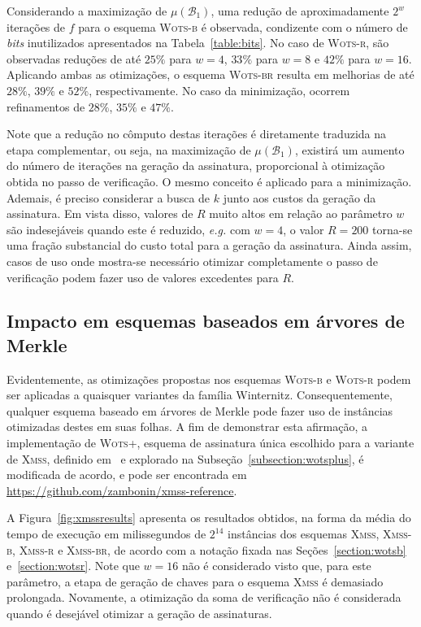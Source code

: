 \documentclass{ufsctex/ufsctex}
\newcommand{\bone}{\mathcal{B}_{1}}
\newcommand{\wotsplus}{\textsc{Wots+}}
\newcommand{\wotsb}{\textsc{Wots-b}}
\newcommand{\wotsr}{\textsc{Wots-r}}
\newcommand{\wotsbr}{\textsc{Wots-br}}
\newcommand{\xmss}{\textsc{Xmss}}
\newcommand{\xmssb}{\textsc{Xmss-b}}
\newcommand{\xmssr}{\textsc{Xmss-r}}
\newcommand{\xmssbr}{\textsc{Xmss-br}}
\begin{document}
Considerando a maximização de $\mu(\bone{})$, uma redução de aproximadamente
$2^{w}$ iterações de $f$ para o esquema \wotsb{} é observada, condizente com o
número de \emph{bits} inutilizados apresentados na Tabela~\ref{table:bits}. No
caso de \wotsr{}, são observadas reduções de até $25\%$ para $w = 4$, $33\%$
para $w = 8$ e $42\%$ para $w = 16$. Aplicando ambas as otimizações, o esquema
\wotsbr{} resulta em melhorias de até $28\%$, $39\%$ e $52\%$, respectivamente.
No caso da minimização, ocorrem refinamentos de $28\%$, $35\%$ e $47\%$.

Note que a redução no cômputo destas iterações é diretamente traduzida na etapa
complementar, ou seja, na maximização de $\mu(\bone{})$, existirá um aumento do
número de iterações na geração da assinatura, proporcional à otimização obtida
no passo de verificação. O mesmo conceito é aplicado para a minimização.
Ademais, é preciso considerar a busca de $k$ junto aos custos da
geração da assinatura. Em vista disso, valores de $R$ muito altos em relação ao
parâmetro $w$ são indesejáveis quando este é reduzido, \emph{e.g.} com $w = 4$,
o valor $R = 200$ torna-se uma fração substancial do custo total para a geração
da assinatura. Ainda assim, casos de uso onde mostra-se necessário otimizar
completamente o passo de verificação podem fazer uso de valores excedentes para
$R$.

\subsection{Impacto em esquemas baseados
  em árvores de Merkle}\label{subsection:impact}

Evidentemente, as otimizações propostas nos esquemas \wotsb{} e \wotsr{} podem
ser aplicadas a quaisquer variantes da família Winternitz. Consequentemente,
qualquer esquema baseado em árvores de Merkle pode fazer uso de instâncias
otimizadas destes em suas folhas. A fim de demonstrar esta afirmação, a
implementação de \wotsplus{}, esquema de assinatura única escolhido para a
variante de \xmss{}, definido em~\cite[Seção 3.1]{Huelsing:report:2018:may} e
explorado na Subseção~\ref{subsection:wotsplus}, é modificada de acordo, e pode
ser encontrada em \url{https://github.com/zambonin/xmss-reference}.

A Figura~\ref{fig:xmssresults} apresenta os resultados obtidos, na forma da
média do tempo de execução em milissegundos de $2^{14}$ instâncias dos esquemas
\xmss{}, \xmssb{}, \xmssr{} e \xmssbr{}, de acordo com a notação fixada nas
Seções~\ref{section:wotsb} e~\ref{section:wotsr}. Note que $w = 16$ não é
considerado visto que, para este parâmetro, a etapa de geração de chaves para o
esquema \xmss{} é demasiado prolongada. Novamente, a otimização da soma de
verificação não é considerada quando é desejável otimizar a geração de
assinaturas.
\end{document}
